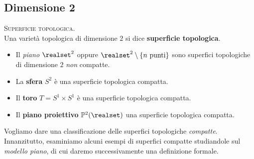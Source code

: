 	\subsection{Dimensione 2}
\begin{define}\textsc{Superficie topologica.}\\
	Una varietà topologica di dimensione $2$ si dice \textbf{superficie topologica}.
\end{define}
\begin{examples}
	\begin{itemize}
		\item Il \textit{piano} $\realset^2$ oppure $\realset^2\setminus \{n\text{ punti}\}$ sono superfici topologiche di dimensione $2$ \textit{non} compatte.
		\item La \textbf{sfera} $S^2$ è una superficie topologica compatta.
		\item Il \textbf{toro} $T=S^1\times S^1$ è una superficie topologica compatta.
		\item Il \textbf{piano proiettivo} $\mathbb{P}^2(\realset)$ una superficie topologica compatta.
	\end{itemize}
\vspace{-3mm}
\end{examples}
Vogliamo dare una classificazione delle superfici topologiche \textit{compatte}. Innanzitutto, esaminiamo alcuni esempi di superfici compatte studiandole sul \textit{modello piano}, di cui daremo successivamente una definizione formale.
